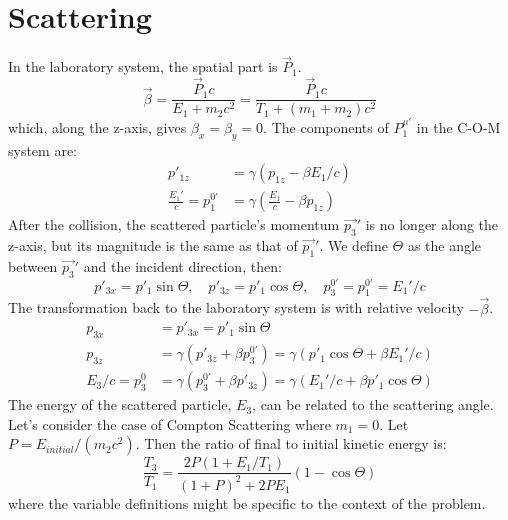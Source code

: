 \documentclass{article}
\begin{document}
    \section*{Scattering}
    In the laboratory system, the spatial part is $\vec{P}_1$.
    $$ \vec{\beta} = \frac{\vec{P}_1 c}{E_1+m_2c^2} = \frac{\vec{P}_1 c}{T_1+(m_1+m_2)c^2} $$
    which, along the z-axis, gives $\beta_x=\beta_y=0$.
    The components of $P_1^{\mu'}$ in the C-O-M system are:
    \begin{align*}
    	p'_{1z} &= \gamma (p_{1z} - \beta E_1/c) \\
    	\frac{E_1'}{c} = p_1^{0'} &= \gamma\left(\frac{E_1}{c} - \beta p_{1z}\right)
    \end{align*}
    After the collision, the scattered particle's momentum $\vec{p_3}'$ is no longer along the z-axis, but its magnitude is the same as that of $\vec{p_1}'$. We define $\Theta$ as the angle between $\vec{p_3}'$ and the incident direction, then:
    $$ p'_{3x} = p'_1 \sin\Theta, \quad p'_{3z} = p'_1 \cos\Theta, \quad p_3^{0'} = p_1^{0'} = E_1'/c $$
    The transformation back to the laboratory system is with relative velocity $-\vec{\beta}$.
    \begin{align*}
    	p_{3x} &= p'_{3x} = p'_1 \sin\Theta \\
    	p_{3z} &= \gamma(p'_{3z} + \beta p_3^{0'}) = \gamma(p'_1 \cos\Theta + \beta E_1'/c) \\
    	E_3/c = p_3^0 &= \gamma(p_3^{0'} + \beta p'_{3z}) = \gamma(E_1'/c + \beta p'_1 \cos\Theta)
    \end{align*}
    The energy of the scattered particle, $E_3$, can be related to the scattering angle. Let's consider the case of Compton Scattering where $m_1=0$. Let $P = E_{initial}/(m_2 c^2)$. Then the ratio of final to initial kinetic energy is:
    $$ \frac{T_3}{T_1} = \frac{2P(1+E_1/T_1)}{(1+P)^2 + 2PE_1} (1-\cos\Theta) $$
    where the variable definitions might be specific to the context of the problem.
    
\end{document}
